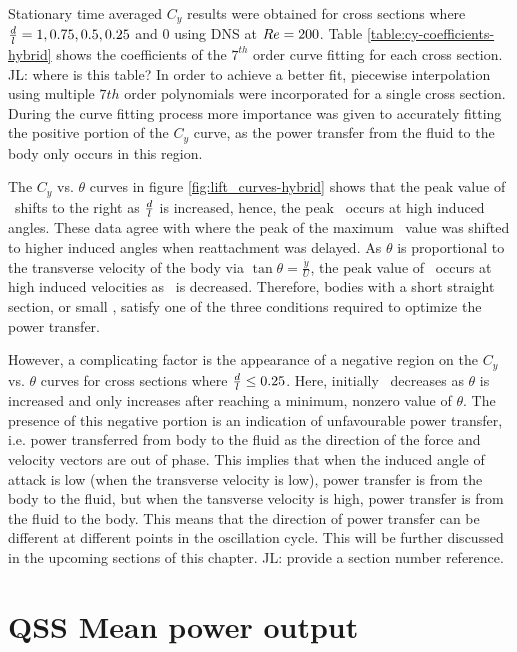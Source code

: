 Stationary time averaged $C_y$ results were obtained for cross sections where $\frac{d}{l}=1,0.75,0.5,0.25$ and $0$ using DNS at $Re=200$. Table \ref{table:cy-coefficients-hybrid} shows the coefficients of the $7^{th}$ order curve fitting for each cross section. JL: where is this table? In order to achieve a better fit, piecewise interpolation using multiple $7th$ order polynomials were incorporated for a single cross section. During the curve fitting process more importance was given to accurately fitting the positive portion of the $C_{y}$ curve, as the power transfer from the fluid to the body only occurs in this region. 

 

The $C_y$ vs. $\theta$ curves in figure \ref{fig:lift_curves-hybrid} shows that the peak value of \cy\ shifts to the right as $\frac{d}{l}$ is increased, hence, the peak \cy\ occurs at high induced angles.  These data agree with \citet{Luo1994} where the peak of the maximum \cy\ value was shifted to higher induced angles when reattachment was delayed. As $\theta$ is proportional to the transverse velocity of the body via $\tan{\theta}=\frac{\dot{y}}{U}$, the peak value of \cy\ occurs at high induced velocities as \ratio\ is decreased. Therefore, bodies with a short straight section, or small \ratio, satisfy one of the three conditions required to optimize the power transfer.

However, a complicating factor is the appearance of a negative region on the $C_y$ vs. $\theta$ curves for cross sections where $\frac{d}{l}\leq0.25$. Here, initially \cy\ decreases as $\theta$ is increased and only increases after reaching a minimum, nonzero value of $\theta$. The presence of this negative portion is an indication of unfavourable power transfer, i.e. power transferred from body to the fluid as the direction of the force and velocity vectors are out of phase. This implies that when the induced angle of attack is low (when the transverse velocity is low), power transfer is from the body to the fluid, but when the tansverse velocity is high, power transfer is from the fluid to the body. This means that the direction of power transfer can be different at different points in the oscillation cycle. This will be further discussed in the upcoming sections of this chapter. JL: provide a section number reference.

 
 
 \section{QSS Mean power output}
 \label{sec:cross-sec-qss-mean power}
 

